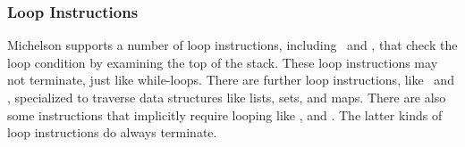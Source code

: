 \documentclass[a4paper,USenglish,cleveref, autoref, thm-restate]{lipics-v2021}
\begin{document}
\subsubsection{Loop Instructions}
Michelson supports a number of loop instructions, including
\LOOP\ and \LOOPLEFT, that  check the loop condition by examining the
top of the stack. These loop instructions may not terminate, just like while-loops. There are further loop instructions, like \ITER\ and
\MAP, specialized to traverse data structures like lists, sets, and maps. There are also
some instructions that implicitly require looping like \CONCAT, and
\SIZE. The latter kinds of loop instructions do always terminate.




\end{document}
